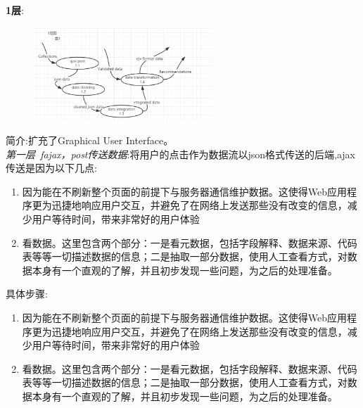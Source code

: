 \documentclass[UTF8]{ctexart}
\begin{document}
\textbf{1层}:\\
\begin{figure}[H]
\centering
\includegraphics[width = 0.6\textwidth]{recommend1-df.png}
\end{figure}
简介:扩充了Graphical User Interface。\\
\emph{第一层~fajax，post传送数据}:将用户的点击作为数据流以json格式传送的后端,ajax传送是因为以下几点:\\
\begin{enumerate}[1)]
\item 因为能在不刷新整个页面的前提下与服务器通信维护数据。这使得Web应用程序更为迅捷地响应用户交互，并避免了在网络上发送那些没有改变的信息，减少用户等待时间，带来非常好的用户体验
\item 看数据。这里包含两个部分：一是看元数据，包括字段解释、数据来源、代码表等等一切描述数据的信息；二是抽取一部分数据，使用人工查看方式，对数据本身有一个直观的了解，并且初步发现一些问题，为之后的处理准备。
\end{enumerate}
具体步骤:\\
\begin{enumerate}[1)]
\item 因为能在不刷新整个页面的前提下与服务器通信维护数据。这使得Web应用程序更为迅捷地响应用户交互，并避免了在网络上发送那些没有改变的信息，减少用户等待时间，带来非常好的用户体验
\item 看数据。这里包含两个部分：一是看元数据，包括字段解释、数据来源、代码表等等一切描述数据的信息；二是抽取一部分数据，使用人工查看方式，对数据本身有一个直观的了解，并且初步发现一些问题，为之后的处理准备。
\end{enumerate}
\end{document}
